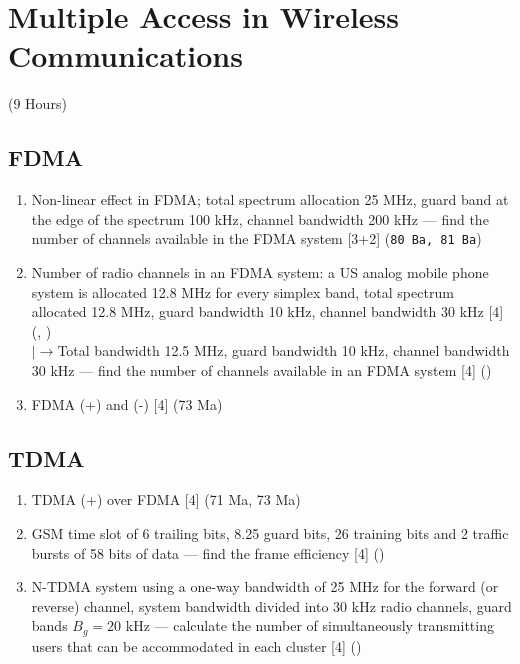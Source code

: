 \documentclass[12pt]{article}
\newcommand{\lb}{\\$\left|\rightarrow\right.$}
\begin{document}
\pagebreak
\section{Multiple Access in Wireless Communications}
\begin{center}(9 Hours)\end{center}

  \subsection{FDMA}
    \begin{enumerate}[topsep=0pt, noitemsep]
      \item Non-linear effect in FDMA; total spectrum allocation 25 MHz, guard band at the edge
        of the spectrum 100 kHz, channel bandwidth 200 kHz --- find the number of channels
        available in the FDMA system \hfill [3+2] (\texttt{80 Ba, 81 Ba})
      \item Number of radio channels in an FDMA system: a US analog mobile phone system is
        allocated 12.8 MHz for every simplex band, total spectrum allocated 12.8 MHz,
        guard bandwidth 10 kHz, channel bandwidth 30 kHz \hfill [4] (, )
        \lb Total bandwidth 12.5 MHz, guard bandwidth 10 kHz, channel bandwidth 30 kHz ---
        find the number of channels available in an FDMA system \hfill [4] ()
      \item FDMA (+) and (-) \hfill [4] (73 Ma)
    \end{enumerate}

  \subsection{TDMA}
    \begin{enumerate}[topsep=0pt, noitemsep]
      \item TDMA (+) over FDMA \hfill [4] (71 Ma, 73 Ma)
      \item GSM time slot of 6 trailing bits, 8.25 guard bits, 26 training bits and
        2 traffic bursts of 58 bits of data --- find the frame efficiency \hfill [4] ()
      \item N-TDMA system using a one-way bandwidth of 25 MHz for the forward (or reverse)
        channel, system bandwidth divided into 30 kHz radio channels, guard bands
        $B_g = 20$ kHz --- calculate the number of simultaneously transmitting users that can be
        accommodated in each cluster \hfill [4] ()
    \end{enumerate}
\end{document}
